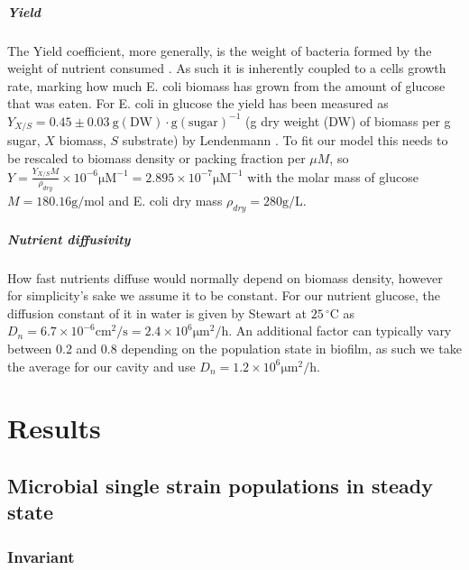 \documentclass[11pt,a4paper]{report}
\begin{document}
	\paragraph{Yield}
	The Yield coefficient, more generally, is the weight of bacteria formed by the weight of nutrient consumed \cite{Murray2}. As such it is inherently coupled to a cells growth rate, marking how much E. coli biomass has grown from the amount of glucose that was eaten. For E. coli in glucose the yield has been measured as $Y_{X/S}=0.45 \pm 0.03\ \mathrm{g(DW)\cdot g(sugar)^{-1}}$ (g dry weight (DW) of biomass per g sugar, $X$ biomass, $S$ substrate) by Lendenmann \cite{Lendenmann}. To fit our model this needs to be rescaled to biomass density or packing fraction per $\mu M$, so $Y=\frac{Y_{X/S}M}{\rho_{dry}} \times 10^{-6}\mathrm{\mu M^{-1}}=2.895 \times 10^{-7}\mathrm{\mu M^{-1}}$ with the molar mass of glucose $M=180.16 \mathrm{g/mol}$ and E. coli dry mass $\rho_{dry}=280 \mathrm{g/L}$.

	\paragraph{Nutrient diffusivity}
	How fast nutrients diffuse would normally depend on biomass density, however for simplicity's sake we assume it to be constant. For our nutrient glucose, the diffusion constant of it in water is given by Stewart \cite{stewart} at $25\,^\circ\mathrm{C}$ as $D_n=6.7 \times 10^{-6}  \mathrm{cm^2/s}=2.4 \times 10^6 \mathrm{\mu m^2/h}$. An additional factor can typically vary between 0.2 and 0.8 depending on the population state in biofilm, as such we take the average for our cavity and use $D_n=1.2 \times 10^6 \mathrm{\mu m^2/h}$.
	
	\chapter{Results}
	
	\section{Microbial single strain populations in steady state}
	\subsection{Invariant}
	\label{sec:invariant_new}
\end{document}

